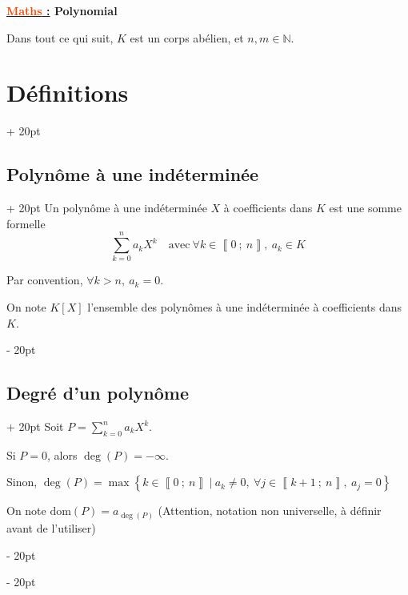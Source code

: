 \documentclass[a4paper, 12pt, twoside]{article}
\renewcommand{\emph}{\textcolor{ff4500}}
\newcommand{\N}{\mathbb{N}} %
\newcommand{\nset}[2]{\left\llbracket #1\ ;\ #2 \right\rrbracket}
\newcommand{\set}[1]{\left\{ #1 \right\}}
\newcommand{\dom}{\mathrm{dom}}
\newcommand{\ind}[1][20pt]{\advance\leftskip + #1}
\newcommand{\deind}[1][20pt]{\advance\leftskip - #1}
\newenvironment{indt}[2][20pt]{#2 \par \ind[#1]}{\par \deind} %
\newcommand{\thetitle}[2]{\begin{center}\textbf{{\LARGE \underline{\emph{#1} :}} {\Large #2}}\end{center}}
\begin{document}
    \thetitle{Maths}{Polynomial}    
    
    \tableofcontents
    \newpage
    
    Dans tout ce qui suit, $K$ est un corps abélien, et $n, m \in \N$.
    
    \begin{indt}{\section{Définitions}}
        
        \begin{indt}{\subsection{Polynôme à une indéterminée}}
            Un polynôme à une indéterminée $X$ à coefficients dans $K$ est une somme formelle
            \[ \sum_{k = 0}^n a_k X^k \quad \text{avec} \ \forall k \in \nset{0}{n},\ a_k \in K \]
            
            Par convention, $\forall k > n,\ a_k = 0$.
            
            On note $K[X]$ l'ensemble des polynômes à une indéterminée à coefficients dans $K$.
        \end{indt}
        
        \vspace{6pt}
        
        \begin{indt}{\subsection{Degré d'un polynôme}}
            Soit $\displaystyle P = \sum_{k = 0}^n a_k X^k$.
            
            \vspace{6pt}
            
            Si $P = 0$, alors $\deg(P) = -\infty$.
            
            Sinon, $\deg(P) = \max \set{k \in \nset{0}{n}\ |\ a_k \neq 0,\ \forall j \in \nset{k + 1}{n},\ a_j = 0}$
            
            \vspace{12pt}
            
            On note $\dom(P) = a_{\deg(P)}$ (Attention, notation non universelle, à définir avant de l'utiliser)
            
            \vspace{6pt}
            

\end{indt}
\end{indt}
\end{document}
